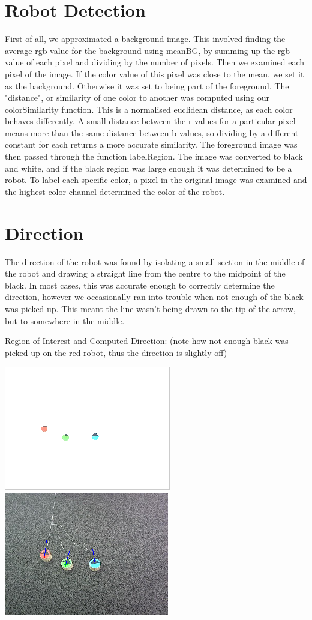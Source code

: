 \documentclass{report}
\begin{document}
\section{Robot Detection}
First of all, we approximated a background image. This involved finding the average rgb value for the background using meanBG, by summing up the rgb value of each pixel and dividing by the number of pixels. Then we examined each pixel of the image. If the color value of this pixel was close to the mean, we set it as the background. Otherwise it was set to being part of the foreground. The "distance", or similarity of one color to another was computed using our colorSimilarity function. This is a normalised euclidean distance, as each color behaves differently. A small distance between the r values for a particular pixel means more than the same distance between b values, so dividing by a different constant for each returns a more accurate similarity.
The foreground image was then passed through the function labelRegion. The image was converted to black and white, and if the black region was large enough it was determined to be a robot. To label each specific color, a pixel in the original image was examined and the highest color channel determined the color of the robot.

\section{Direction}
The direction of the robot was found by isolating a small section in the middle of the robot and drawing a straight line from the centre to the midpoint of the black. In most cases, this was accurate enough to correctly determine the direction, however we occasionally ran into trouble when not enough of the black was picked up. This meant the line wasn't being drawn to the tip of the arrow, but to somewhere in the middle. 

Region of Interest and Computed Direction: (note how not enough black was picked up on the red robot, thus the direction is slightly off)

\includegraphics[scale=0.7]{regionofinterest}
\includegraphics[scale=0.7]{direction}
\end{document}
